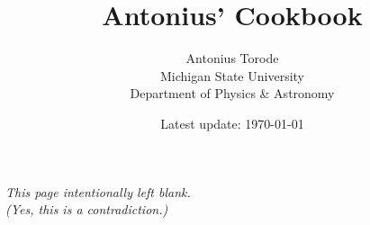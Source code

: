 \documentclass[a4paper,11pt]{book}
\title{Antonius' Cookbook}
\author{Antonius Torode \\ Michigan State University \\ Department of Physics \& Astronomy}
\date{Latest update: \today}
\begin{document}
\frontmatter
\maketitle

\tableofcontents
\newpage
\vspace*{\fill}
\begin{center}
	\textit{This page intentionally left blank. \\ (Yes, this is a contradiction.)}
\end{center}
\vspace*{\fill}

\mainmatter

\backmatter
\end{document}
